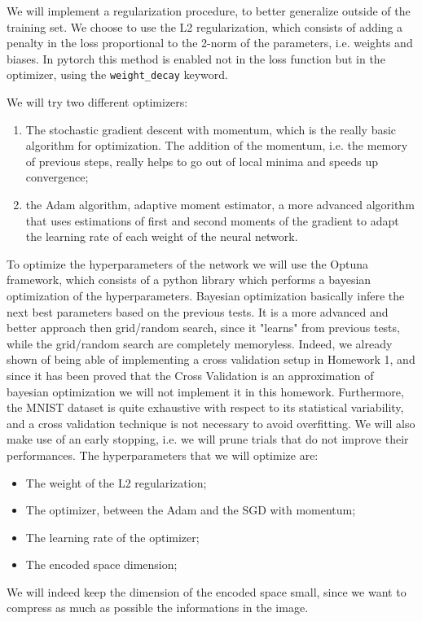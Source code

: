 We will implement a regularization procedure, to better generalize outside of the training set. We choose to use the L2 regularization, which consists of adding a penalty 
in the loss proportional to the 2-norm of the parameters, i.e. weights and biases. In pytorch this method is enabled not in the loss
function but in the optimizer, using the \lstinline{weight_decay} keyword.

We will try two different optimizers:
\begin{enumerate}
    \item The stochastic gradient descent with momentum, which is the really basic algorithm for optimization.
        The addition of the momentum, i.e. the memory of previous steps, really helps to go out of local minima and speeds up convergence;
    \item the Adam algorithm, adaptive moment estimator, a more advanced algorithm that uses estimations of first and second 
        moments  of the gradient to adapt the learning rate of each weight of the neural network.
\end{enumerate}

To optimize the hyperparameters of the network we will use the Optuna framework\cite{optuna_2019}, which consists of a python library which performs a bayesian optimization of the 
hyperparameters. Bayesian optimization basically infere the next best parameters based on the previous tests. It is a more advanced and better approach then grid/random search, 
since it "learns" from previous tests, while the grid/random search are completely memoryless. Indeed, we already shown of being able of implementing a cross validation setup in 
Homework 1, and since it has been proved that the Cross Validation is an approximation of bayesian optimization\cite{fong2020marginal} we will not implement it in this homework.
Furthermore, the MNIST dataset is quite exhaustive with respect to its statistical variability, and a cross validation technique is not necessary to avoid overfitting.
We will also make use of an early stopping, i.e. we will prune  trials that do not improve their performances.
The hyperparameters that we will optimize are:
\begin{itemize}
    \item The weight of the L2 regularization;
    \item The optimizer, between the Adam and the SGD with momentum;
    \item The learning rate of the optimizer;
    \item The encoded space dimension;
\end{itemize}
We will indeed keep the dimension of the encoded space small, since we want to compress as much as possible the informations in the image.

